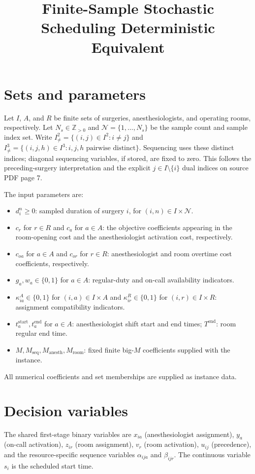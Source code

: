 \documentclass[11pt,a4paper]{article}
\title{Finite-Sample Stochastic Scheduling Deterministic Equivalent}
\author{}
\date{}
\begin{document}
\maketitle

\section*{Sets and parameters}
Let $I$, $A$, and $R$ be finite sets of surgeries, anesthesiologists, and operating rooms, respectively. Let $N_s\in\mathbb{Z}_{>0}$ and $\mathcal{N}=\{1,\ldots,N_s\}$ be the sample count and sample index set. Write $I^2_{\ne}=\{(i,j)\in I^2:i\ne j\}$ and $I^3_{\ne}=\{(i,j,h)\in I^3:i,j,h\text{ pairwise distinct}\}$. Sequencing uses these distinct indices; diagonal sequencing variables, if stored, are fixed to zero. This follows the preceding-surgery interpretation and the explicit $j\in I\setminus\{i\}$ dual indices on source PDF page 7.

The input parameters are:
\begin{itemize}
\item $d_i^n\geq 0$: sampled duration of surgery $i$, for $(i,n)\in I\times\mathcal{N}$.
\item $c_r$ for $r\in R$ and $c_a$ for $a\in A$: the objective coefficients appearing in the room-opening cost and the anesthesiologist activation cost, respectively.
\item $c_{oa}$ for $a\in A$ and $c_{or}$ for $r\in R$: anesthesiologist and room overtime cost coefficients, respectively.
\item $g_a,w_a\in\{0,1\}$ for $a\in A$: regular-duty and on-call availability indicators.
\item $\kappa^A_{ia}\in\{0,1\}$ for $(i,a)\in I\times A$ and $\kappa^R_{ir}\in\{0,1\}$ for $(i,r)\in I\times R$: assignment compatibility indicators.
\item $t_a^{\mathrm{start}},t_a^{\mathrm{end}}$ for $a\in A$: anesthesiologist shift start and end times; $T^{\mathrm{end}}$: room regular end time.
\item $M,M_{\mathrm{seq}},M_{\mathrm{anesth}},M_{\mathrm{room}}$: fixed finite big-$M$ coefficients supplied with the instance.
\end{itemize}
All numerical coefficients and set memberships are supplied as instance data.

\section*{Decision variables}
The shared first-stage binary variables are $x_{ia}$ (anesthesiologist assignment), $y_a$ (on-call activation), $z_{ir}$ (room assignment), $v_r$ (room activation), $u_{ij}$ (precedence), and the resource-specific sequence variables $\alpha_{ija}$ and $\beta_{ijr}$. The continuous variable $s_i$ is the scheduled start time.
\end{document}
